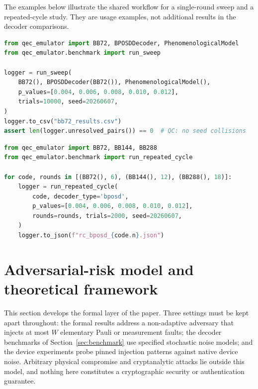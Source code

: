 \documentclass[pdflatex,sn-mathphys-num]{sn-jnl}
\theoremstyle{thmstyleone}
\theoremstyle{thmstyletwo}
\theoremstyle{thmstylethree}
\begin{document}
The examples below illustrate the shared workflow for a single-round sweep and a repeated-cycle study. They are usage examples, not additional results in the decoder comparisons.\label{ssec:emulator-usage}

\begin{lstlisting}[language=Python,caption={Single-round sweep with
  provenance logging (QEC Emulator v2.0.0).}]
from qec_emulator import BB72, BPOSDDecoder, PhenomenologicalModel
from qec_emulator.benchmark import run_sweep

logger = run_sweep(
    BB72(), BPOSDDecoder(BB72()), PhenomenologicalModel(),
    p_values=[0.004, 0.006, 0.008, 0.010, 0.012],
    trials=10000, seed=20260607,
)
logger.to_csv("bb72_results.csv")
assert len(logger.unresolved_pairs()) == 0  # QC: no seed collisions
\end{lstlisting}

\begin{lstlisting}[language=Python,caption={Repeated-cycle benchmark
  across three code sizes (v2.0.0 protocol).}]
from qec_emulator import BB72, BB144, BB288
from qec_emulator.benchmark import run_repeated_cycle

for code, rounds in [(BB72(), 6), (BB144(), 12), (BB288(), 18)]:
    logger = run_repeated_cycle(
        code, decoder_type='bposd',
        p_values=[0.004, 0.006, 0.008, 0.010, 0.012],
        rounds=rounds, trials=2000, seed=20260607,
    )
    logger.to_json(f"rc_bposd_{code.n}.json")
\end{lstlisting}

\section{Adversarial-risk model and theoretical framework}
\label{sec:ace}

This section develops the formal layer of the paper. Three settings must be kept apart throughout: the formal results address a non-adaptive adversary that injects at most $W$ elementary Pauli or measurement faults; the decoder benchmarks of Section~\ref{sec:benchmark} use specified stochastic noise models; and the device experiments probe pinned injection patterns against native device noise. Arbitrary physical compromise and cryptanalytic attacks lie outside this model, and nothing here constitutes a cryptographic security or authentication guarantee.
\end{document}
